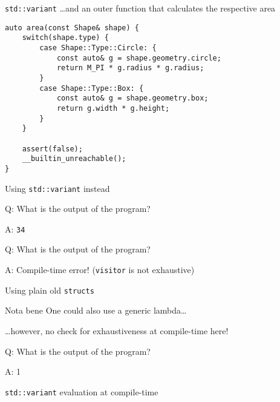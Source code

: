 \begin{frame}[fragile]{\texttt{std::variant}}
    \ldots and an outer function that calculates the respective area
    \begin{lstlisting}
auto area(const Shape& shape) {
    switch(shape.type) {
        case Shape::Type::Circle: {
            const auto& g = shape.geometry.circle;
            return M_PI * g.radius * g.radius;
        }
        case Shape::Type::Box: {
            const auto& g = shape.geometry.box;
            return g.width * g.height;
        }
    }

    assert(false);
    __builtin_unreachable();
}
    \end{lstlisting}
\end{frame}

\begin{frame}
\end{frame}

\begin{frame}[fragile]{Using \texttt{std::variant} instead}
\end{frame}

\begin{frame}
    \centering
    \scalebox{8.}{\}}
\end{frame}

\begin{frame}[fragile]{Q: What is the output of the program?}
\end{frame}

\begin{frame}[fragile]{A: \texttt{34}}
\end{frame}

\begin{frame}[fragile]{Q: What is the output of the program?}
\end{frame}

\begin{frame}[fragile]{A: Compile-time error! (\texttt{visitor} is not exhaustive)}
\end{frame}

\begin{frame}[fragile]{Using plain old \texttt{structs}}
\end{frame}

\begin{frame}{Nota bene}
    One could also use a generic lambda\ldots

    \hfill \ldots however, no check for exhaustiveness at compile-time here!
\end{frame}

\begin{frame}{Q: What is the output of the program?}
\end{frame}

\begin{frame}{A: 1}
\end{frame}

\begin{frame}{\texttt{std::variant} evaluation at compile-time}
\end{frame}
